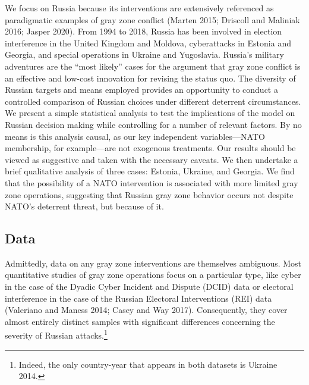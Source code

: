 \documentclass[
]{article}
\begin{document}
We focus on Russia because its interventions are extensively referenced as paradigmatic examples of gray zone conflict (Marten 2015; Driscoll and Maliniak 2016; Jasper 2020). From 1994 to 2018, Russia has been involved in election interference in the United Kingdom and Moldova, cyberattacks in Estonia and Georgia, and special operations in Ukraine and Yugoslavia. Russia's military adventures are the ``most likely'' cases for the argument that gray zone conflict is an effective and low-cost innovation for revising the status quo. The diversity of Russian targets and means employed provides an opportunity to conduct a controlled comparison of Russian choices under different deterrent circumstances. We present a simple statistical analysis to test the implications of the model on Russian decision making while controlling for a number of relevant factors. By no means is this analysis causal, as our key independent variables---NATO membership, for example---are not exogenous treatments. Our results should be viewed as suggestive and taken with the necessary caveats. We then undertake a brief qualitative analysis of three cases: Estonia, Ukraine, and Georgia. We find that the possibility of a NATO intervention is associated with more limited gray zone operations, suggesting that Russian gray zone behavior occurs not despite NATO's deterrent threat, but because of it.

\hypertarget{data}{%
\subsection{Data}\label{data}}

Admittedly, data on any gray zone interventions are themselves ambiguous. Most quantitative studies of gray zone operations focus on a particular type, like cyber in the case of the Dyadic Cyber Incident and Dispute (DCID) data or electoral interference in the case of the Russian Electoral Interventions (REI) data (Valeriano and Maness 2014; Casey and Way 2017). Consequently, they cover almost entirely distinct samples with significant differences concerning the severity of Russian attacks.\footnote{Indeed, the only country-year that appears in both datasets is Ukraine 2014.}
\end{document}
